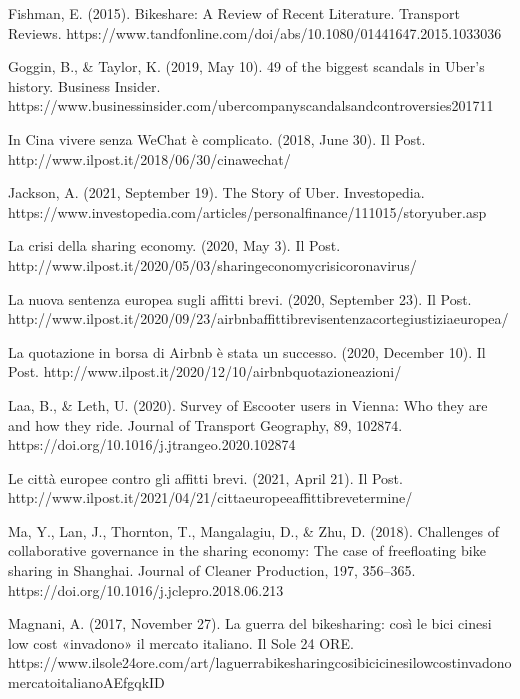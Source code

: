 \documentclass[letterpaper,10pt,english]{jupyterBook}
\begin{document}
\sphinxAtStartPar
Fishman, E. (2015). Bikeshare: A Review of Recent Literature. Transport Reviews. https://www.tandfonline.com/doi/abs/10.1080/01441647.2015.1033036

\sphinxAtStartPar
Goggin, B., \& Taylor, K. (2019, May 10). 49 of the biggest scandals in Uber’s history. Business Insider. https://www.businessinsider.com/uber\sphinxhyphen{}company\sphinxhyphen{}scandals\sphinxhyphen{}and\sphinxhyphen{}controversies\sphinxhyphen{}2017\sphinxhyphen{}11

\sphinxAtStartPar
In Cina vivere senza WeChat è complicato. (2018, June 30). Il Post. http://www.ilpost.it/2018/06/30/cina\sphinxhyphen{}wechat/

\sphinxAtStartPar
Jackson, A. (2021, September 19). The Story of Uber. Investopedia. https://www.investopedia.com/articles/personal\sphinxhyphen{}finance/111015/story\sphinxhyphen{}uber.asp

\sphinxAtStartPar
La crisi della sharing economy. (2020, May 3). Il Post. http://www.ilpost.it/2020/05/03/sharing\sphinxhyphen{}economy\sphinxhyphen{}crisi\sphinxhyphen{}coronavirus/

\sphinxAtStartPar
La nuova sentenza europea sugli affitti brevi. (2020, September 23). Il Post. http://www.ilpost.it/2020/09/23/airbnb\sphinxhyphen{}affitti\sphinxhyphen{}brevi\sphinxhyphen{}sentenza\sphinxhyphen{}corte\sphinxhyphen{}giustizia\sphinxhyphen{}europea/

\sphinxAtStartPar
La quotazione in borsa di Airbnb è stata un successo. (2020, December 10). Il Post. http://www.ilpost.it/2020/12/10/airbnb\sphinxhyphen{}quotazione\sphinxhyphen{}azioni/

\sphinxAtStartPar
Laa, B., \& Leth, U. (2020). Survey of E\sphinxhyphen{}scooter users in Vienna: Who they are and how they ride. Journal of Transport Geography, 89, 102874. https://doi.org/10.1016/j.jtrangeo.2020.102874

\sphinxAtStartPar
Le città europee contro gli affitti brevi. (2021, April 21). Il Post. http://www.ilpost.it/2021/04/21/citta\sphinxhyphen{}europee\sphinxhyphen{}affitti\sphinxhyphen{}breve\sphinxhyphen{}termine/

\sphinxAtStartPar
Ma, Y., Lan, J., Thornton, T., Mangalagiu, D., \& Zhu, D. (2018). Challenges of collaborative governance in the sharing economy: The case of free\sphinxhyphen{}floating bike sharing in Shanghai. Journal of Cleaner Production, 197, 356–365. https://doi.org/10.1016/j.jclepro.2018.06.213

\sphinxAtStartPar
Magnani, A. (2017, November 27). La guerra del bike\sphinxhyphen{}sharing: così le bici cinesi low cost «invadono» il mercato italiano. Il Sole 24 ORE. https://www.ilsole24ore.com/art/la\sphinxhyphen{}guerra\sphinxhyphen{}bike\sphinxhyphen{}sharing\sphinxhyphen{}cosi\sphinxhyphen{}bici\sphinxhyphen{}cinesi\sphinxhyphen{}low\sphinxhyphen{}cost\sphinxhyphen{}invadono\sphinxhyphen{}mercato\sphinxhyphen{}italiano\sphinxhyphen{}AEfgqkID
\end{document}
